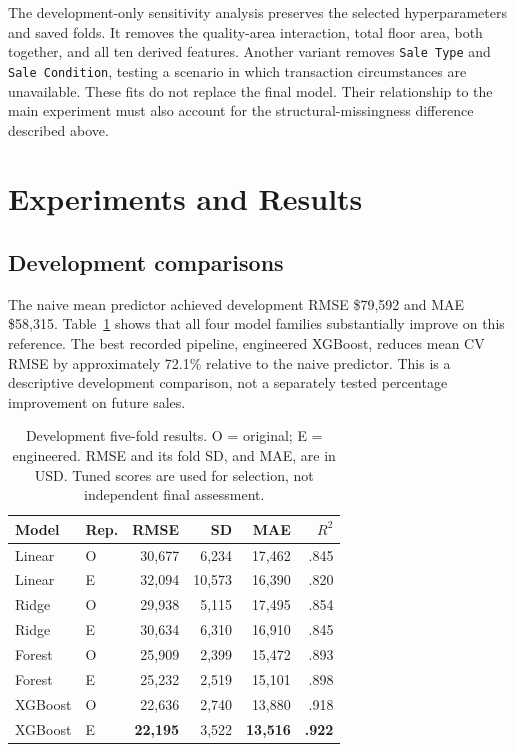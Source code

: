 \documentclass{sigkddExp}
\begin{document}
The development-only sensitivity analysis preserves the selected hyperparameters and saved folds. It removes the quality-area interaction, total floor area, both together, and all ten derived features. Another variant removes \texttt{Sale Type} and \texttt{Sale Condition}, testing a scenario in which transaction circumstances are unavailable. These fits do not replace the final model. Their relationship to the main experiment must also account for the structural-missingness difference described above.

\section{Experiments and Results}
\subsection{Development comparisons}
The naive mean predictor achieved development RMSE \$79,592 and MAE \$58,315. Table~\ref{tab:cv} shows that all four model families substantially improve on this reference. The best recorded pipeline, engineered XGBoost, reduces mean CV RMSE by approximately 72.1\% relative to the naive predictor. This is a descriptive development comparison, not a separately tested percentage improvement on future sales.

\begin{table}[t]
\caption{Development five-fold results. O = original; E = engineered. RMSE and its fold SD, and MAE, are in USD. Tuned scores are used for selection, not independent final assessment.}
\label{tab:cv}
\centering\small
\begin{tabular}{llrrrr}
\toprule
Model & Rep. & RMSE & SD & MAE & $R^2$\\
\midrule
Linear & O & 30,677 & 6,234 & 17,462 & .845\\
Linear & E & 32,094 & 10,573 & 16,390 & .820\\
Ridge & O & 29,938 & 5,115 & 17,495 & .854\\
Ridge & E & 30,634 & 6,310 & 16,910 & .845\\
Forest & O & 25,909 & 2,399 & 15,472 & .893\\
Forest & E & 25,232 & 2,519 & 15,101 & .898\\
XGBoost & O & 22,636 & 2,740 & 13,880 & .918\\
XGBoost & E & \textbf{22,195} & 3,522 & \textbf{13,516} & \textbf{.922}\\
\bottomrule
\end{tabular}
\end{table}
\end{document}
